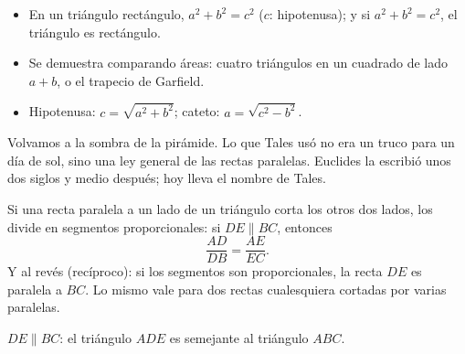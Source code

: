 \documentclass[11pt]{article}
\begin{document}
\begin{resumen}
\begin{itemize}
  \item En un triángulo rectángulo, $a^2 + b^2 = c^2$ ($c$: hipotenusa); y
        si $a^2 + b^2 = c^2$, el triángulo es rectángulo.
  \item Se demuestra comparando áreas: cuatro triángulos en un cuadrado de
        lado $a + b$, o el trapecio de Garfield.
  \item Hipotenusa: $c = \sqrt{a^2 + b^2}$; cateto: $a = \sqrt{c^2 - b^2}$.
\end{itemize}
\end{resumen}

\label{tema:teoremathales}

\begin{hilo}
Volvamos a la sombra de la pirámide. Lo que Tales usó no era un truco para
un día de sol, sino una ley general de las rectas paralelas. Euclides la
escribió unos dos siglos y medio después; hoy lleva el nombre de Tales.
\end{hilo}

\begin{teorema}
Si una recta paralela a un lado de un triángulo corta los otros dos lados,
los divide en segmentos proporcionales: si $DE \parallel BC$, entonces
\[
  \frac{AD}{DB} = \frac{AE}{EC}.
\]
Y al revés (recíproco): si los segmentos son proporcionales, la recta $DE$
es paralela a $BC$. Lo mismo vale para dos rectas cualesquiera cortadas por
varias paralelas.
\end{teorema}

\begin{center}

{\small $DE \parallel BC$: el triángulo $ADE$ es semejante al triángulo $ABC$.}
\end{center}
\end{document}
